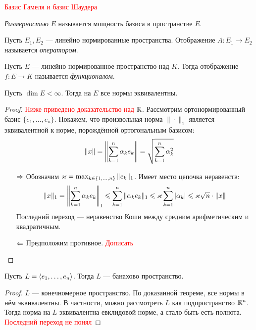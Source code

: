 \begin{definition}
	\textcolor{red}{Базис Гамеля и базис Шаудера}
\end{definition}

\begin{definition}
	\textit{Размерностью} $E$ называется мощность базиса в пространстве $E$.
\end{definition}

\begin{definition}
	Пусть $E_1, E_2$ --- линейно нормированные пространства. Отображение $A \colon E_1 \to E_2$ называется \textit{оператором}.
\end{definition}

\begin{definition}
	Пусть $E$ --- линейно нормированное пространство над $K$. Тогда отображение $f \colon E \to K$ называется \textit{функционалом}.
\end{definition}

\begin{theorem}
	Пусть $\dim E < \infty$. Тогда на $E$ все нормы эквивалентны.
\end{theorem}

\begin{proof}
	\textcolor{red}{Ниже приведено доказательство над $\mathbb{R}$}. Рассмотрим ортонормированный базис $\{e_1, \ldots, e_n\}$. Покажем, что произвольная норма $\|\cdot\|_1$ является эквивалентной к норме, порождённой ортогональным базисом:
	\[
		\|x\| = \left\|\sum_{k = 1}^n \alpha_k e_k\right\| = \sqrt{\sum_{k = 1}^n \alpha_k^2}
	\]
	\begin{itemize}
		\item[$\Rightarrow$] Обозначим $\varkappa = \max_{k \in \{1, \ldots, n\}} \|e_k\|_1$. Имеет место цепочка неравенств:
		\[
			\|x\|_1 = \left\|\sum_{k = 1}^n \alpha_ke_k\right\|_1 \leqslant \sum_{k = 1}^n \|\alpha_ke_k\|_1 \leqslant \varkappa \sum_{k = 1}^n |\alpha_k| \leqslant \varkappa \sqrt{n} \cdot \|x\|
		\]
		Последний переход --- неравенство Коши между средним арифметическим и квадратичным.
		
		\item[$\Leftarrow$] Предположим противное. \textcolor{red}{Дописать}
	\end{itemize}
\end{proof}

\begin{proposition}
	Пусть $L = \left\langle e_1, \ldots, e_n\right\rangle$. Тогда $L$ --- банахово пространство.
\end{proposition}

\begin{proof}
	$L$ --- конечномерное пространство. По доказанной теореме, все нормы в нём эквивалентны. В частности, можно рассмотреть $L$ как подпространство $\mathbb{R}^n$. Тогда норма на $L$ эквивалентна евклидовой норме, а стало быть есть полнота. \textcolor{red}{Последний переход не понял}
\end{proof}

